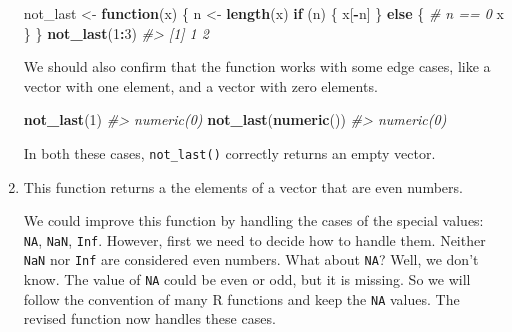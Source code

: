 \documentclass[]{book}
\newenvironment{Shaded}{\begin{snugshade}}{\end{snugshade}}
\newcommand{\CommentTok}[1]{\textcolor[rgb]{0.56,0.35,0.01}{\textit{#1}}}
\newcommand{\ControlFlowTok}[1]{\textcolor[rgb]{0.13,0.29,0.53}{\textbf{#1}}}
\newcommand{\DecValTok}[1]{\textcolor[rgb]{0.00,0.00,0.81}{#1}}
\newcommand{\KeywordTok}[1]{\textcolor[rgb]{0.13,0.29,0.53}{\textbf{#1}}}
\newcommand{\NormalTok}[1]{#1}
\newcommand{\OperatorTok}[1]{\textcolor[rgb]{0.81,0.36,0.00}{\textbf{#1}}}
\newcommand{\StringTok}[1]{\textcolor[rgb]{0.31,0.60,0.02}{#1}}
\theoremstyle{plain}
\theoremstyle{remark}
\begin{document}
\begin{enumerate}
\begin{Shaded}
\begin{Highlighting}[]
\NormalTok{not_last <-}\StringTok{ }\ControlFlowTok{function}\NormalTok{(x) \{}
\NormalTok{  n <-}\StringTok{ }\KeywordTok{length}\NormalTok{(x)}
  \ControlFlowTok{if}\NormalTok{ (n) \{}
\NormalTok{    x[}\OperatorTok{-}\NormalTok{n]}
\NormalTok{  \} }\ControlFlowTok{else}\NormalTok{ \{}
    \CommentTok{# n == 0}
\NormalTok{    x}
\NormalTok{  \}}
\NormalTok{\}}
\KeywordTok{not_last}\NormalTok{(}\DecValTok{1}\OperatorTok{:}\DecValTok{3}\NormalTok{)}
\CommentTok{#> [1] 1 2}
\end{Highlighting}
\end{Shaded}

  We should also confirm that the function works with some edge cases,
  like a vector with one element, and a vector with zero elements.

\begin{Shaded}
\begin{Highlighting}[]
\KeywordTok{not_last}\NormalTok{(}\DecValTok{1}\NormalTok{)}
\CommentTok{#> numeric(0)}
\KeywordTok{not_last}\NormalTok{(}\KeywordTok{numeric}\NormalTok{())}
\CommentTok{#> numeric(0)}
\end{Highlighting}
\end{Shaded}

  In both these cases, \texttt{not\_last()} correctly returns an empty
  vector.
\item
  This function returns a the elements of a vector that are even
  numbers.

\begin{Shaded}
\end{Shaded}

  We could improve this function by handling the cases of the special
  values: \texttt{NA}, \texttt{NaN}, \texttt{Inf}. However, first we
  need to decide how to handle them. Neither \texttt{NaN} nor
  \texttt{Inf} are considered even numbers. What about \texttt{NA}?
  Well, we don't know. The value of \texttt{NA} could be even or odd,
  but it is missing. So we will follow the convention of many R
  functions and keep the \texttt{NA} values. The revised function now
  handles these cases.


\end{enumerate}
\end{document}
